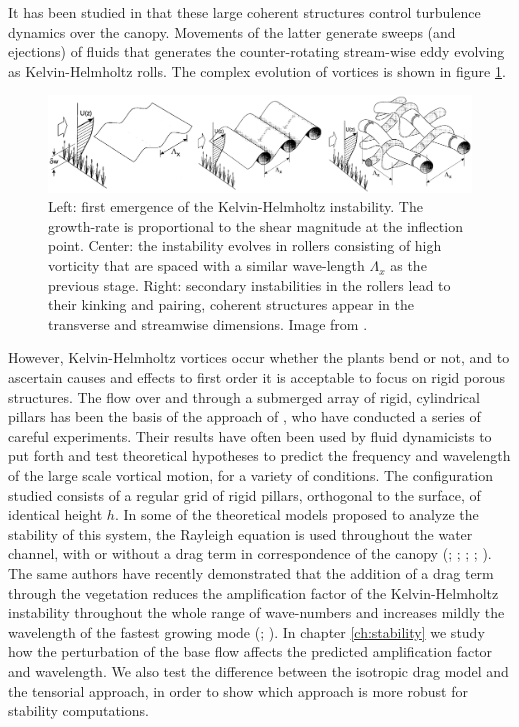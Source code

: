 It has been studied in \citet{finnigan2000turbulence} that these large coherent structures control turbulence dynamics over the canopy. 
Movements of the latter generate sweeps (and ejections) of fluids that generates the counter-rotating stream-wise eddy evolving as Kelvin-Helmholtz rolls.
The complex evolution of vortices is shown in figure \ref{fig:monai_evol}.

\begin{figure}[h]
	\centering
	\includegraphics[width=1\linewidth]{chapter_1/finn}
	\caption{Left: first emergence of the Kelvin-Helmholtz instability. The growth-rate is proportional to the shear magnitude at the inflection point. Center: the instability evolves in rollers consisting of high vorticity that are spaced with a similar wave-length $\Lambda_x$ as the previous stage.  Right: secondary instabilities in the rollers lead to their kinking and pairing, coherent structures appear in the transverse and streamwise dimensions. Image from \citet{finnigan2000turbulence}.}
	\label{fig:monai_evol}
\end{figure}


However, Kelvin-Helmholtz vortices occur whether the plants bend or not, and to ascertain causes and effects to first order it is acceptable to focus on rigid porous structures.
The flow over and through a submerged array of rigid, cylindrical pillars has been the basis of the approach of \citet{ghisalberti2002mixing} \cite{ghisalberti2004limited} \cite{ghisalberti2005mass}, who have conducted a series of careful experiments. Their results have often been used by fluid dynamicists to put forth and test theoretical hypotheses to predict the frequency and wavelength of the large scale vortical motion, for a variety of conditions.
The configuration studied consists of a regular grid of rigid pillars, orthogonal to the surface, of identical height $h$.
In some of the theoretical models proposed to analyze the stability of this system, the Rayleigh equation is
used throughout the water channel, with or without a drag term in correspondence of the canopy (\citet{raupach1996coherent}; \citet{py2004mixing}; \citet{singh2016linear}; \citet{zampogna2016instability}; \citet{luminari2016drag}). The same authors have recently demonstrated that the addition of a drag term through the vegetation reduces the amplification factor of the Kelvin-Helmholtz instability throughout the whole range of wave-numbers and increases mildly the wavelength of the fastest growing mode (\citet{zampogna2016instability}; \citet{luminari2016drag}).
In chapter \ref{ch:stability} we study how the perturbation of the base flow affects the predicted amplification factor and wavelength. We also test the difference between the isotropic drag model and the tensorial approach, in order to show which approach is more robust for stability computations.


